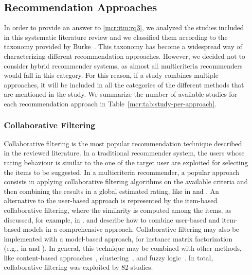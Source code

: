 \subsection{Recommendation Approaches}
\label{mcr:sec:approaches}

In order to provide an answer to \ref{mcr:itm:rq3}, we analyzed the studies included in this systematic literature review and we classified them according to the taxonomy provided by Burke~\cite{Burke2007}. This taxonomy has become a widespread way of characterizing different recommendation approaches. However, we decided not to consider hybrid recommender systems, as almost all multicriteria recommenders would fall in this category. For this reason, if a study combines multiple approaches, it will be included in all the categories of the different methods that are mentioned in the study. We summarize the number of available studies for each recommendation approach in Table~\ref{mcr:tab:study-per-approach}.

\subsubsection{Collaborative Filtering}

Collaborative filtering is the most popular recommendation technique described in the reviewed literature. In a traditional recommender system, the users whose rating behaviour is similar to the one of the target user are exploited for selecting the items to be suggested. In a multicriteria recommender, a popular approach consists in applying collaborative filtering algorithms on the available criteria and then combining the results in a global estimated rating, like in  and . An alternative to the user-based approach is represented by the item-based collaborative filtering, where the similarity is computed among the items, as discussed, for example, in .   and  describe how to combine user-based and item-based models in a comprehensive approach. Collaborative filtering may also be implemented with a model-based approach, for instance matrix factorization (e.g., in  and ). In general, this technique may be combined with other methods, like content-based approaches~, clustering~, and fuzzy logic~. In total, collaborative filtering was exploited by 82 studies.

